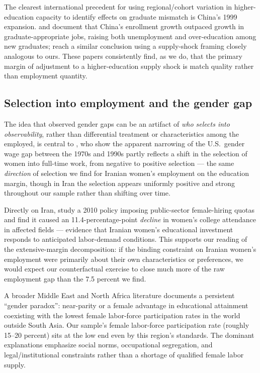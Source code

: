 \documentclass[11pt]{article}
\begin{document}
The clearest international precedent for using regional/cohort variation in higher-education capacity to identify effects on graduate mismatch is China's 1999 expansion. \citet{li2014} and \citet{li2008} document that China's enrollment growth outpaced growth in graduate-appropriate jobs, raising both unemployment and over-education among new graduates; \citet{knight2017} reach a similar conclusion using a supply-shock framing closely analogous to ours. These papers consistently find, as we do, that the primary margin of adjustment to a higher-education supply shock is match quality rather than employment quantity.

\subsection{Selection into employment and the gender gap}

The idea that observed gender gaps can be an artifact of \emph{who selects into observability}, rather than differential treatment or characteristics among the employed, is central to \citet{mulligan2008}, who show the apparent narrowing of the U.S.\ gender wage gap between the 1970s and 1990s partly reflects a shift in the selection of women into full-time work, from negative to positive selection --- the same \emph{direction} of selection we find for Iranian women's employment on the education margin, though in Iran the selection appears uniformly positive and strong throughout our sample rather than shifting over time.

Directly on Iran, \citet{tanaka2023} study a 2010 policy imposing public-sector female-hiring quotas and find it caused an 11.4-percentage-point \emph{decline} in women's college attendance in affected fields --- evidence that Iranian women's educational investment responds to anticipated labor-demand conditions. This supports our reading of the extensive-margin decomposition: if the binding constraint on Iranian women's employment were primarily about their own characteristics or preferences, we would expect our counterfactual exercise to close much more of the raw employment gap than the 7.5 percent we find.

A broader Middle East and North Africa literature documents a persistent ``gender paradox'': near-parity or a female advantage in educational attainment coexisting with the lowest female labor-force participation rates in the world outside South Asia. Our sample's female labor-force participation rate (roughly 15--20 percent) sits at the low end even by this region's standards. The dominant explanations emphasize social norms, occupational segregation, and legal/institutional constraints rather than a shortage of qualified female labor supply.
\end{document}
